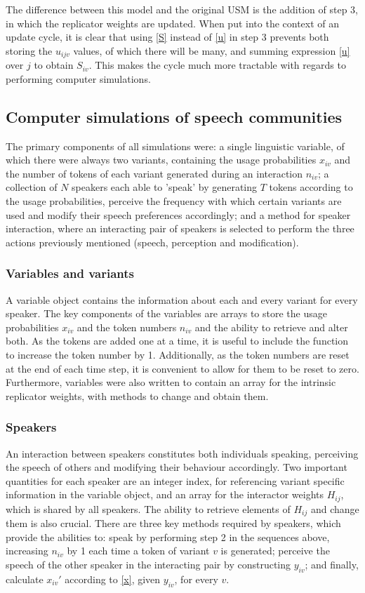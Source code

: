 \documentclass[12pt]{article}
\begin{document}
The difference between this model and the original USM is the addition of step 3, in which the replicator weights are updated. When put into the context of an update cycle, it is clear that using \eqref{S} instead of \eqref{u} in step 3 prevents both storing the $u_{ijv}$ values, of which there will be many, and summing expression \eqref{u} over $j$ to obtain $S_{iv}$. This makes the cycle much more tractable with regards to performing computer simulations.

\subsection{Computer simulations of speech communities}
The primary components of all simulations were: a single linguistic variable, of which there were always two variants, containing the usage probabilities $x_{iv}$ and the number of tokens of each variant generated during an interaction $n_{iv}$; a collection of $N$ speakers each able to 'speak' by generating $T$ tokens according to the usage probabilities, perceive the frequency with which certain variants are used and modify their speech preferences accordingly; and a method for speaker interaction, where an interacting pair of speakers is selected to perform the three actions previously mentioned (speech, perception and modification). 

\subsubsection{Variables and variants}
A variable object contains the information about each and every variant for every speaker. The key components of the variables are arrays to store the usage probabilities $x_{iv}$ and the token numbers $n_{iv}$ and the ability to retrieve and alter both. As the tokens are added one at a time, it is useful to include the function to increase the token number by 1. Additionally, as the token numbers are reset at the end of each time step, it is convenient to allow for them to be reset to zero. Furthermore, variables were also written to contain an array for the intrinsic replicator weights, with methods to change and obtain them.

\subsubsection{Speakers}
An interaction between speakers constitutes both individuals speaking, perceiving the speech of others and modifying their behaviour accordingly. Two important quantities for each speaker are an integer index, for referencing variant specific information in the variable object, and an array for the interactor weights $H_{ij}$, which is shared by all speakers. The ability to retrieve elements of $H_{ij}$ and change them is also crucial. There are three key methods required by speakers, which provide the abilities to: speak by performing step 2 in the sequences above, increasing $n_{iv}$ by 1 each time a token of variant $v$ is generated; perceive the speech of the other speaker in the interacting pair by constructing $y_{iv}$; and finally, calculate $x_{iv}'$ according to \eqref{x}, given $y_{iv}$, for every $v$. 
\end{document}
